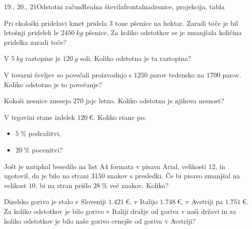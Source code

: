 \begin{priprava}{19., 20., 21}{}{Odstotni račun}{Realna števila}{frontalna}{drsnice, projekcija, tabla}
\begin{multicols}{2}
\end{multicols}
    
    
        \begin{naloga}
            Pri ekološki pridelavi kmet pridela $3$ tone pšenice na hektar. 
            Zaradi toče je bil letošnji pridelek le $2450~kg$ pšenice.
            Za koliko odstotkov se je zmanjšala količina pridelka zaradi toče? 
        \end{naloga}

        \begin{naloga}
            V $5~kg$ raztopine je $120~g$ soli. Koliko odstotna je ta raztopina? 
        \end{naloga}

        \begin{naloga}
            V tovarni čevljev so povečali proizvodnjo s $1250$ parov tedensko na $1700$ parov.
            Koliko odstotno je to povečanje? 
        \end{naloga}
    

    
        \begin{naloga}
            Kokoši nesnice znesejo $270$ jajc letno. 
            Koliko odstotna je njihova nesnost? 
        \end{naloga}

        \begin{naloga}
            V trgovini stane izdelek $120~€$. Koliko stane po:
            \begin{itemize}
                \item $5~\%$ podražitvi,
                \item $20~\%$ pocenitvi?
            \end{itemize}
        \end{naloga}

        \begin{naloga}
            Jošt je natipkal besedilo na list A4 formata v pisava Arial, velikosti $12$, in ugotovil, da je bilo na strani $3150$ znakov s presledki.
            Če bi pisavo zmanjšal na velikost $10$, bi na stran prišlo $28~\%$ več znakov. Koliko? 
        \end{naloga}
    

    
    
        \begin{naloga}
            Dizelsko gorivo je stalo v Sloveniji $1.421~€$, v Italijo $1.748~€$, v Avstriji pa $1.751~€$.
            Za koliko odstotkov je bilo gorivo v Italiji dražje od goriva v naši državi in za koliko odstotkov je bilo
            naše gorivo cenejše od goriva v Avstriji? 
        \end{naloga}


\end{priprava}
